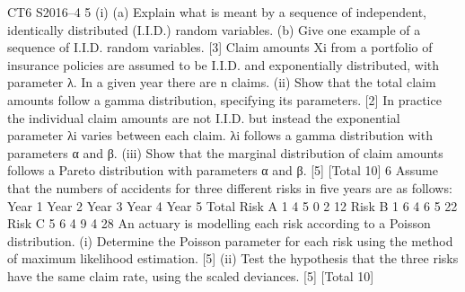 CT6 S2016–4
5 (i) (a) Explain what is meant by a sequence of independent, identically
distributed (I.I.D.) random variables.
(b) Give one example of a sequence of I.I.D. random variables.
[3]
Claim amounts Xi from a portfolio of insurance policies are assumed to be I.I.D. and
exponentially distributed, with parameter λ. In a given year there are n claims.
(ii) Show that the total claim amounts follow a gamma distribution, specifying its
parameters. [2]
In practice the individual claim amounts are not I.I.D. but instead the exponential
parameter λi varies between each claim. λi follows a gamma distribution with
parameters α and β.
(iii) Show that the marginal distribution of claim amounts follows a Pareto
distribution with parameters α and β. [5]
[Total 10]
6 Assume that the numbers of accidents for three different risks in five years are as
follows:
  Year 1 Year 2 Year 3 Year 4 Year 5 Total
Risk A 1 4 5 0 2 12
Risk B 1 6 4 6 5 22
Risk C 5 6 4 9 4 28
An actuary is modelling each risk according to a Poisson distribution.
(i) Determine the Poisson parameter for each risk using the method of maximum
likelihood estimation. [5]
(ii) Test the hypothesis that the three risks have the same claim rate, using the
scaled deviances. [5]
[Total 10]


